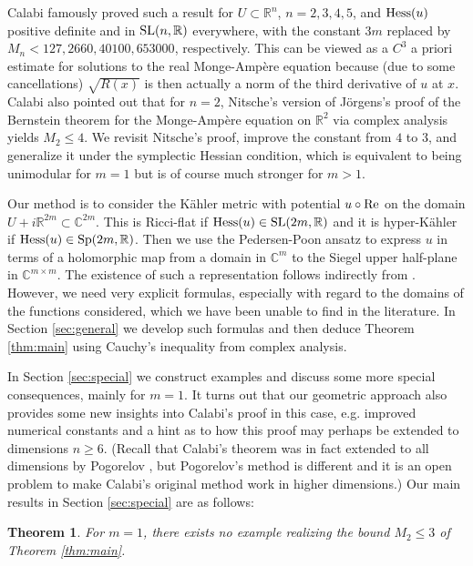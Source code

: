 \documentclass[11pt,reqno]{amsart}
\renewcommand{\leq}{\leqslant}
\renewcommand{\geq}{\geqslant}
\theoremstyle{plain}
\newtheorem{theorem}{Theorem}[section]
\theoremstyle{definition}
\numberwithin{equation}{section}
\begin{document}
Calabi \cite{EC} famously proved such a result for $U \subset \mathbb{R}^n$, $n =2,3,4,5$, and ${\rm Hess}(u)$ positive definite and in ${\rm SL}(n,\mathbb{R})$ everywhere, with the constant $3m$ replaced by $M_n <  127, 2660, 40100, 653000$, respectively. This can be viewed as a $C^3$ a priori estimate for solutions to the real Monge-Ampère equation because (due to some cancellations) $\sqrt{R(x)}$ is then actually a norm of the third derivative of $u$ at $x$. Calabi also pointed out that for $n = 2$, Nitsche's version \cite{Nit} of Jörgens's proof \cite{Jor} of the Bernstein theorem for the Monge-Ampère equation on $\mathbb{R}^{2}$ via complex analysis yields $M_2 \leq 4$. We revisit Nitsche's proof, improve the constant from $4$ to $3$, and generalize it under the symplectic Hessian condition, which is equivalent to being unimodular for $m = 1$ but is of course much stronger for $m > 1$.

Our method is to consider the Kähler metric with  potential $u \circ {\rm Re}$ on the domain $U + i\mathbb{R}^{2m} \subset \mathbb{C}^{2m}$. This is Ricci-flat if ${\rm Hess}(u) \in {\rm SL}(2m,\mathbb{R})$ and it is hyper-Kähler if ${\rm Hess}(u) \in {\rm Sp}(2m,\mathbb{R})$. Then we use the Pedersen-Poon ansatz \cite{PP} to express $u$ in terms of a holomorphic map from a domain in $\mathbb{C}^m$ to the Siegel upper half-plane in $\mathbb{C}^{m \times m}$. The existence of such a representation follows indirectly from \cite{ACD,BC,VC,Freed,Hit1,Hit2}. However, we need very explicit formulas, especially with regard to the domains of the functions considered, which we have been unable to find in the literature. In Section \ref{sec:general} we develop such formulas and then deduce Theorem \ref{thm:main} using Cauchy's inequality from complex analysis.

In Section \ref{sec:special} we construct examples and discuss some more special consequences, mainly for $m = 1$. It turns out that our geometric approach also provides some new insights into Calabi's proof in this case, e.g. improved numerical constants and a hint as to how this proof may perhaps be extended to dimensions $n \geq 6$. (Recall that Calabi's theorem was in fact extended to all dimensions by Pogorelov \cite{Pogo}, but Pogorelov's method is different and it is an open problem to make Calabi's original method work in higher dimensions.) Our main results in Section \ref{sec:special} are as follows:

\begin{theorem}\label{thm:main:3_not_sharp}
    For $m=1$, there exists no example realizing the bound $M_2 \leq 3$ of Theorem \ref{thm:main}.
\end{theorem}
\end{document}
